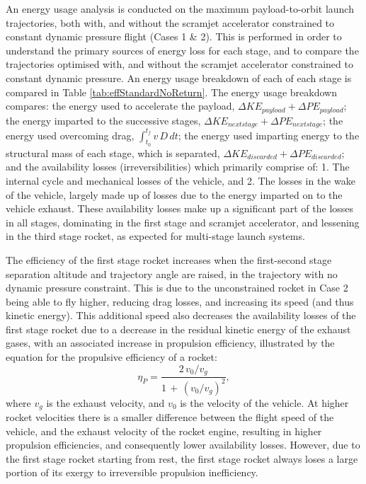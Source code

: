 An energy usage analysis is conducted on the maximum payload-to-orbit launch trajectories, both with, and without the scramjet accelerator constrained to constant dynamic pressure flight (Cases 1 \& 2). This is performed in order to understand the primary sources of energy loss for each stage, and to compare the trajectories optimised with, and without the scramjet accelerator constrained to constant dynamic pressure. An energy usage breakdown of each of each stage is compared in Table \ref{tab:effStandardNoReturn}. The energy usage breakdown compares: the energy used to accelerate the payload, $\Delta KE_{payload} + \Delta PE_{payload}$; the energy imparted to the successive stages, $\Delta KE_{next stage} + \Delta PE_{next stage}$; the energy used overcoming drag, $\int_{t_0}^{t_f} v\,D \, dt$; the energy used imparting energy to the structural mass of each stage, which is separated, $\Delta KE_{discarded} + \Delta PE_{discarded}$; and the availability losses (irreversibilities) which primarily comprise of: 1. The internal cycle and mechanical losses of the vehicle, and 2. The losses in the wake of the vehicle, largely made up of losses due to the energy imparted on to the vehicle exhaust\cite{Riggins2019,Riggins2013}. These availability losses make up a significant part of the losses in all stages, dominating in the first stage and scramjet accelerator, and lessening in the third stage rocket, as expected for multi-stage launch systems\cite{Riggins2019,Riggins2013,Gilbert2015}. 



 The efficiency of the first stage rocket increases when the first-second stage separation altitude and trajectory angle are raised, in the trajectory with no dynamic pressure constraint. 
  This is due to the unconstrained rocket in Case 2 being able to fly higher, reducing drag losses, and increasing its speed (and thus kinetic energy). 
  This additional speed also decreases the availability losses of the first stage rocket due to a decrease in the residual kinetic energy of the exhaust gases, with an associated increase in propulsion efficiency, illustrated by the equation for the propulsive efficiency of a rocket\cite{RPE}:
 \begin{equation}\label{eq:rocketeff}
 \eta_P = \frac{2\,v_0/v_g}{1\,+\,(v_0/v_g)^2}, 
 \end{equation}
 where $v_g$ is the exhaust velocity, and $v_0$ is the velocity of the vehicle.
 At higher rocket velocities there is a smaller difference between the flight speed of the vehicle, and the exhaust velocity of the rocket engine, resulting in higher propulsion efficiencies, and consequently lower availability losses. 
 However, due to the first stage rocket starting from rest, the first stage rocket always loses a large portion of its exergy to irreversible propulsion inefficiency.  
 
